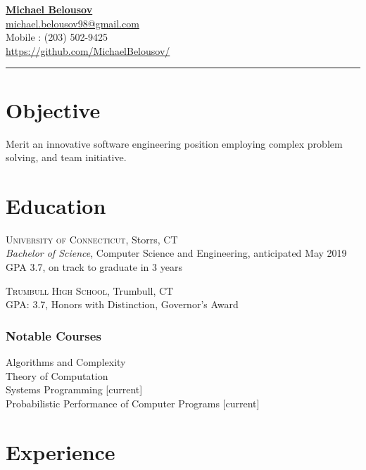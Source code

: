 \documentclass[Letterpaper,11pt]{article}
\begin{document}
\setlength{\parindent}{0em}
\setlength{\parskip}{1em}
\setlength{\parsep}{1em}
\setlength{\itemsep}{0.2em}
\setlength{\headsep}{0.2em}
\setlength{\topskip}{0.2em}
\setlength{\topmargin}{0.2em}
\setlength{\topsep}{0.2em}
\setlength{\partopsep}{0.2em}
\setlength{\columnsep}{1em}

\addtolength{\topmargin}{-2em}

\textbf{\href{mailto:michael.belousov98@gmail.com}{\Large Michael Belousov}}\\ 
\href{mailto:michael.belousov98@gmail.com}{michael.belousov98@gmail.com}\\  
Mobile : (203) 502-9425\\
\href{https://github.com/MichaelBelousov/}{https://github.com/MichaelBelousov/}\\  
\hrule

\section*{Objective}

Merit an innovative software engineering position employing complex problem solving, and team initiative.

\section*{Education}
    
    \textsc{University of Connecticut}, Storrs, CT\\
    \textit{Bachelor of Science}, Computer Science and Engineering, anticipated May 2019\\
    GPA 3.7, on track to graduate in 3 years

    \textsc{Trumbull High School}, Trumbull, CT\\
    GPA: 3.7, Honors with Distinction, Governor's Award

    \subsubsection*{Notable Courses}
    Algorithms and Complexity\\
    Theory of Computation\\
    Systems Programming [current]\\
    Probabilistic Performance of Computer Programs [current]

\section*{Experience}
\end{document}
